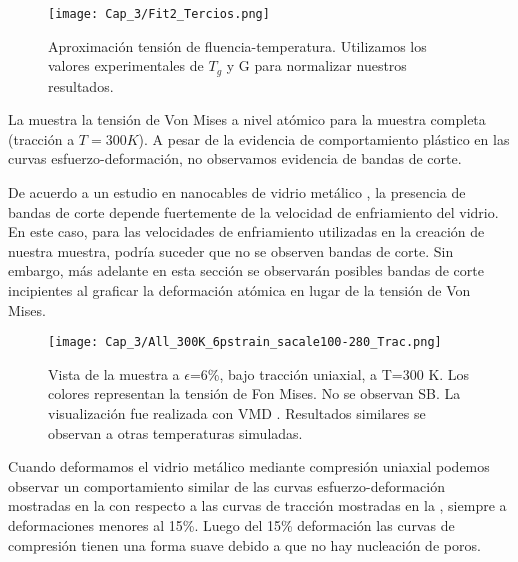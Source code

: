 \begin{figure}[htp]
\centering
\texttt{[image: Cap\_3/Fit2\_Tercios.png]}
\caption[Aproximación tensión de fluencia-temperatura]{Aproximación tensión de fluencia-temperatura. Utilizamos los valores experimentales de $T_g$ y G \citep{johnson05} para normalizar nuestros resultados.}
\label{C3:fg:fitDosTercios}
\end{figure}

La  muestra la tensión de Von Mises a nivel atómico para la muestra completa (tracción a $T=300K$). A pesar de la evidencia de comportamiento plástico en las curvas esfuerzo-deformación, no observamos evidencia de bandas de corte.


De acuerdo a un estudio en nanocables de vidrio metálico \citep{xiao12}, la presencia de bandas de corte depende fuertemente de la velocidad de enfriamiento del vidrio. En este caso, para las velocidades de enfriamiento utilizadas en la creación de nuestra muestra, podría suceder que no se observen bandas de corte. Sin embargo, más adelante en esta sección se observarán posibles bandas de corte incipientes al graficar la deformación atómica en lugar de la tensión de Von Mises.


\begin{figure}[htp]
\centering
\texttt{[image: Cap\_3/All\_300K\_6pstrain\_sacale100-280\_Trac.png]}
\caption[Vista de la muestra a $\epsilon$=6\%, bajo tracción uniaxial, a T=300 K]{Vista de la muestra a $\epsilon$=6\%, bajo tracción uniaxial, a T=300 K. Los colores representan la tensión de Fon Mises. No se observan SB. La visualización fue realizada con VMD \citep{humphrey96}. Resultados similares se observan a otras temperaturas simuladas.}
\label{C3:fg:sampleTen}
\end{figure}

Cuando deformamos el vidrio metálico mediante compresión uniaxial podemos observar un comportamiento similar de las curvas esfuerzo-deformación mostradas en la  con respecto a las curvas de tracción mostradas en la , siempre a deformaciones menores al 15\%. Luego del 15\% deformación las curvas de compresión tienen una forma suave debido a que no hay nucleación de poros.

